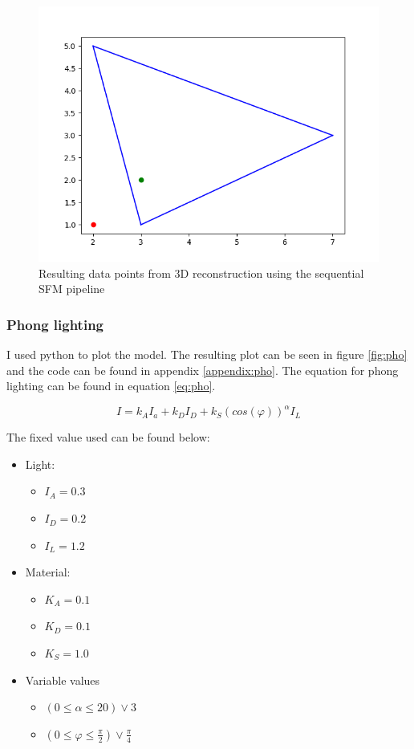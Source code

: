 \documentclass{article}
\begin{document}
\begin{figure}[H]
    \centering
    \includegraphics[width=1\textwidth]{tri.png} 
    \caption{Resulting data points from 3D reconstruction using the sequential SFM pipeline}
    \label{fig:tri}
\end{figure}

\subsubsection{Phong lighting}
I used python to plot the model. The resulting plot can be seen in figure \ref{fig:pho} and the code can be found in appendix \ref{appendix:pho}. The equation for phong lighting can be found in equation \ref{eq:pho}.

\begin{equation}
    \label{eq:pho}
    I=k_AI_a + k_DI_D+k_S(cos(\varphi))^\alpha I_L
\end{equation}

The fixed value used can be found below:
\begin{itemize}
    \item Light:
    \begin{itemize}
        \item $I_A = 0.3$
        \item $I_D = 0.2$
        \item $I_L = 1.2$
    \end{itemize}
    \item Material:
    \begin{itemize}
        \item $K_A = 0.1$
        \item $K_D = 0.1$
        \item $K_S = 1.0$ 
    \end{itemize}
    \item Variable values
    \begin{itemize}
        \item $(0 \leq \alpha \leq 20) \vee 3 $
        \item $(0 \leq \varphi \leq \frac{\pi}{2}) \vee \frac{\pi}{4}$
    \end{itemize}
\end{itemize}
\end{document}
